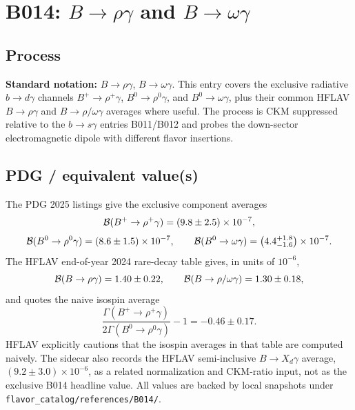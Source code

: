 
\section{B014: \(B\to\rho\gamma\) and \(B\to\omega\gamma\)}

\subsection*{Process}
\textbf{Standard notation:} \(B\to\rho\gamma\), \(B\to\omega\gamma\).
This entry covers the exclusive radiative \(b\to d\gamma\) channels
\(B^+\to\rho^+\gamma\), \(B^0\to\rho^0\gamma\), and
\(B^0\to\omega\gamma\), plus their common HFLAV \(B\to\rho\gamma\) and
\(B\to\rho/\omega\gamma\) averages where useful.  The process is CKM
suppressed relative to the \(b\to s\gamma\) entries B011/B012 and probes the
down-sector electromagnetic dipole with different flavor insertions.

\subsection*{PDG / equivalent value(s)}
The PDG 2025 listings give the exclusive component averages
\[
  {\cal B}(B^+\to\rho^+\gamma)=(9.8\pm2.5)\times10^{-7},
\]
\[
  {\cal B}(B^0\to\rho^0\gamma)=(8.6\pm1.5)\times10^{-7},
\qquad
  {\cal B}(B^0\to\omega\gamma)=
    \left(4.4^{+1.8}_{-1.6}\right)\times10^{-7}.
\]
The HFLAV end-of-year 2024 rare-decay table gives, in units of \(10^{-6}\),
\[
  {\cal B}(B\to\rho\gamma)=1.40\pm0.22,\qquad
  {\cal B}(B\to\rho/\omega\gamma)=1.30\pm0.18,
\]
and quotes the naive isospin average
\[
  \frac{\Gamma(B^+\to\rho^+\gamma)}
       {2\Gamma(B^0\to\rho^0\gamma)}-1=-0.46\pm0.17.
\]
HFLAV explicitly cautions that the isospin averages in that table are computed
naively.  The sidecar also records the HFLAV semi-inclusive
\(B\to X_d\gamma\) average, \((9.2\pm3.0)\times10^{-6}\), as a related
normalization and CKM-ratio input, not as the exclusive B014 headline value.
All values are backed by local snapshots under
\texttt{flavor\_catalog/references/B014/}.

